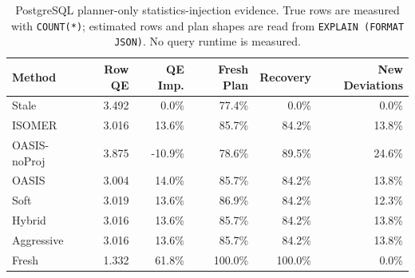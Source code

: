 \begin{table}[t]
  \centering
  \small
  \caption{PostgreSQL planner-only statistics-injection evidence. True rows are measured with \texttt{COUNT(*)}; estimated rows and plan shapes are read from \texttt{EXPLAIN (FORMAT JSON)}. No query runtime is measured.}
  \label{tab:postgres_planner_stats_injection}
  \setlength{\tabcolsep}{4pt}
  \begin{tabular}{lrrrrr}
    \toprule
    Method & Row QE & QE Imp. & Fresh Plan & Recovery & New Deviations \\
    \midrule
    Stale & 3.492 & 0.0\% & 77.4\% & 0.0\% & 0.0\% \\
    ISOMER & 3.016 & 13.6\% & 85.7\% & 84.2\% & 13.8\% \\
    OASIS-noProj & 3.875 & -10.9\% & 78.6\% & 89.5\% & 24.6\% \\
    OASIS & 3.004 & 14.0\% & 85.7\% & 84.2\% & 13.8\% \\
    Soft & 3.019 & 13.6\% & 86.9\% & 84.2\% & 12.3\% \\
    Hybrid & 3.016 & 13.6\% & 85.7\% & 84.2\% & 13.8\% \\
    Aggressive & 3.016 & 13.6\% & 85.7\% & 84.2\% & 13.8\% \\
    Fresh & 1.332 & 61.8\% & 100.0\% & 100.0\% & 0.0\% \\
    \bottomrule
  \end{tabular}
\end{table}
